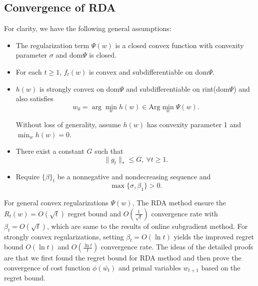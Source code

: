 \subsection{Convergence of RDA}
For clarity, we have the following general assumptions:
\begin{itemize}
	\item The regularization term $\Psi(w)$ is a closed convex function with convexity parameter $\sigma$ and $\text{dom}\Psi$ is closed.
	\item For each $t\geq 1$, $f_t(w)$ is convex and subdifferentiable on dom$\Psi$.
	\item $h(w)$ is strongly convex on dom$\Psi$ and subdifferentiable on rint(dom$\Psi$) and also satisfies
	\begin{equation}\label{assumpation7}
		w_0=\arg\min_w h(w)\in \text{Arg}\min_w \Psi(w).
	\end{equation}
	
	Without loss of generality, assume $h(w)$ has convexity parameter 1 and $\min_w h(w)=0$.
	\item There exist a constant $G$ such that 
	\begin{equation}\label{assumpation12}
		\|g_t\|_{\ast}\leq G,~\forall t\geq 1.
	\end{equation}
	\item Require $\{\beta\}_t$ be a nonnegative and nondecreasing sequence and 
	\begin{equation}\label{assumpation13}
		\max\{\sigma,\beta_1\}>0.
	\end{equation}
\end{itemize}
For general convex regularizations $\Psi(w)$, The RDA method ensure the $R_t(w) = O(\sqrt{t})$ regret bound and $O(\frac{1}{\sqrt{t}})$ convergence rate with $\beta_t=O(\sqrt{t})$, which are same to the results of online subgradient method.
For strongly convex regularizations, setting $\beta_t=O(\ln t)$ yields the improved regret bound $O(\ln t)$ and $O(\frac{\ln t}{t})$ convergence rate. The ideas of the detailed proofs are that we first found the regret bound for RDA method and then prove the convergence of cost function $\phi(\bar{w_t})$ and primal variables $w_{t+1}$ based on the regret bound. 
